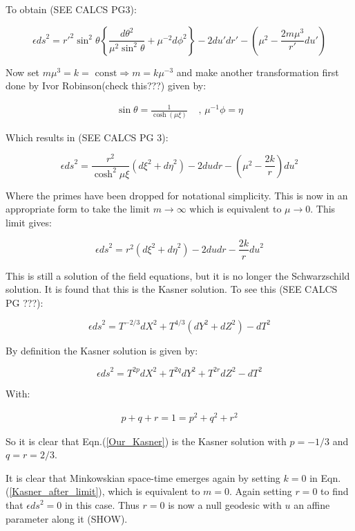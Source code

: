 \noindent To obtain (SEE CALCS PG3):

\begin{equation*}
\epsilon {ds}^2 = {r'}^2 \sin^2 \theta \left\{ \frac{{d\theta}^2}{\mu^2 \sin^2 \theta} +  \mu^{-2} {d \phi}^2 \right\} - 2 {du'} {dr'} - \left( \mu^2 - \frac{2 m \mu^3}{r'} {du'} \right) 
\end{equation*}

\noindent Now set $m \mu^{3} = k = \text{ const} \Rightarrow m = k \mu^{-3}$ and make another transformation first done by Ivor Robinson(check this???) given by:

\begin{eqnarray} 
\sin{\theta} = \frac{1}{\cosh{(\mu \xi)}} & \text{   ,    } \mu^{-1} \phi = \eta  
\end{eqnarray} 

\noindent Which results in (SEE CALCS PG 3): 

\begin{equation*}
\epsilon {ds}^2 = \frac{r^2}{\cosh^{2}{\mu \xi}} ({d\xi}^2 + {d\eta}^2) - 2 {du}{dr} - \left( \mu^{2} - \frac{2k}{r} \right) {du}^2
\end{equation*}

\noindent Where the primes have been dropped for notational simplicity. This is now in an appropriate form to take the limit $m \rightarrow \infty$ which is equivalent to $\mu \rightarrow 0$. This limit gives:

\begin{equation}\label{Kasner_after_limit}
\epsilon {ds}^2 = r^2 ({d\xi}^2 + {d\eta}^2) - 2 {du}{dr} - \frac{2k}{r} {du}^2
\end{equation}

\noindent This is still a solution of the field equations, but it is no longer the Schwarzschild solution. It is found that this is the Kasner solution. To see this (SEE CALCS PG ???):

\begin{equation}\label{Our_Kasner} 
\epsilon {ds}^2 = T^{-2/3} {dX}^2 + T^{4/3} \left( dY^2 + dZ^2 \right) - dT^2
\end{equation}

\noindent By definition the Kasner solution is given by:

\begin{equation*} 
\epsilon {ds}^2 = T^{2p} {dX}^2 + T^{2q} dY^2 + T^{2r} dZ^2 - dT^2
\end{equation*}

\noindent With:

\begin{eqnarray*}
p + q + r = 1 = p^2 + q^2 + r^2
\end{eqnarray*}

\noindent So it is clear that Eqn.(\ref{Our_Kasner}) is the Kasner solution with $p = -1/3$ and $q = r = 2/3$.

It is clear that Minkowskian space-time emerges again by setting $k = 0$ in Eqn.(\ref{Kasner_after_limit}), which is equivalent to $m = 0$. Again setting $r = 0$ to find that $\epsilon {ds}^2 = 0$ in this case. Thus $r = 0$ is now a null geodesic with $u$ an affine parameter along it (SHOW).  


